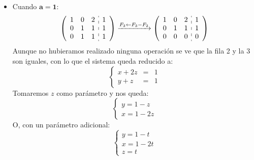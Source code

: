 \documentclass[a4paper,11pt,answers]{exam}
\begin{document}
\begin{questions}
\begin{solution}
\begin{itemize}
      \item Cuando $\boldsymbol{a=1}$:
        \[\left(\begin{array}{rrr:r}
		1&0&2&1\\
		0&1&1&1\\
		0&1&1&1
	\end{array}\right) \xrightarrow{F_3 \leftarrow F_3 - F_2} \left(\begin{array}{rrr:r}
		1&0&2&1\\
		0&1&1&1\\
		0&0&0&0
	\end{array}\right) 
        \]
        Aunque no hubieramos realizado ninguna operación se ve que la fila 2 y la 3 son iguales, con lo que el sistema queda reducido a:
        \[\left\lbrace\begin{array}{lll}
        x+2z &=& 1\\
        y+z &=& 1
        \end{array}\right.\]
        Tomaremos $z$ como parámetro y nos queda:
        \[\left\lbrace\begin{array}{l}
        y=1-z\\
        x=1-2z
        \end{array}\right.\]
        O, con un parámetro adicional:
        \[\left\lbrace\begin{array}{l}
        y=1-t\\
        x=1-2t\\
        z=t
        \end{array}\right.\]
        \end{itemize}
\end{solution}
\end{questions}
\end{document}
